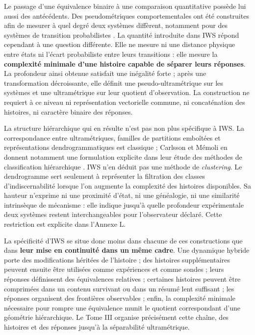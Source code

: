 \documentclass[
  11pt,
  a4paper,
  openany]{book}
\theoremstyle{definition}
\begin{document}
Le passage d’une équivalence binaire à une comparaison quantitative possède lui aussi des antécédents. Des pseudométriques comportementales ont été construites afin de mesurer à quel degré deux systèmes diffèrent, notamment pour des systèmes de transition probabilistes \cite{vanbreugel2005behavioural}. La quantité introduite dans IWS répond cependant à une question différente. Elle ne mesure ni une distance physique entre états ni l’écart probabiliste entre leurs transitions : elle mesure la \textbf{complexité minimale d’une histoire capable de séparer leurs réponses}. La profondeur ainsi obtenue satisfait une inégalité forte ; après une transformation décroissante, elle définit une pseudo-ultramétrique sur les systèmes et une ultramétrique sur leur quotient d’observation. La construction ne requiert à ce niveau ni représentation vectorielle commune, ni concaténation des histoires, ni caractère binaire des réponses. 

La structure hiérarchique qui en résulte n’est pas non plus spécifique à IWS. La correspondance entre ultramétriques, familles de partitions emboîtées et représentations dendrogrammatiques est classique ; Carlsson et Mémoli en donnent notamment une formulation explicite dans leur étude des méthodes de classification hiérarchique \cite{carlsson2010characterization}. IWS n’en déduit pas une méthode de \textit{clustering}. Le dendrogramme sert seulement à représenter la filtration des classes d’indiscernabilité lorsque l’on augmente la complexité des histoires disponibles. Sa hauteur n’exprime ni une proximité d’état, ni une généalogie, ni une similarité intrinsèque de mécanisme : elle indique jusqu’à quelle profondeur expérimentale deux systèmes restent interchangeables pour l’observateur déclaré. Cette restriction est explicite dans l’Annexe L. 

La spécificité d’IWS se situe donc moins dans chacune de ces constructions que dans \textbf{leur mise en continuité dans un même cadre}. Une dynamique hybride porte des modifications héritées de l’histoire ; des histoires supplémentaires peuvent ensuite être utilisées comme expériences et comme sondes ; leurs réponses définissent des équivalences relatives ; certaines histoires peuvent être comprimées dans un contenu survivant ou dans un résumé lent suffisant ; les réponses organisent des frontières observables ; enfin, la complexité minimale nécessaire pour rompre une équivalence munit le quotient correspondant d’une géométrie hiérarchique. Le Tome III organise précisément cette chaîne, des histoires et des réponses jusqu’à la séparabilité ultramétrique. 
\end{document}
